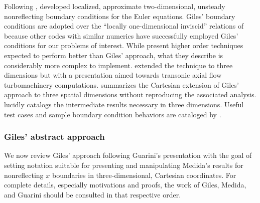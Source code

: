 \documentclass[letterpaper,11pt,nointlimits,reqno,draft]{amsbook}
\begin{document}
Following \citet{Engquist1977Absorbing},
\citet{Giles1988Nonreflecting,Giles1990Nonreflecting} developed localized,
approximate two-dimensional, unsteady nonreflecting boundary conditions for the
Euler equations.  Giles' boundary conditions are adopted over the ``locally
one-dimensional inviscid'' relations of \citet{Poinsot1992Boundary} because
other codes with similar numerics have successfully employed Giles' conditions
for our problems of interest.  While \citet{Rowley2000Discretely} present
higher order techniques expected to perform better than Giles' approach, what
they describe is considerably more complex to implement.
\citet{Saxer1993QuasiThreeDimensional} extended the technique to three
dimensions but with a presentation aimed towards transonic axial flow
turbomachinery computations.  \citet{Guarini1998} summarizes the Cartesian
extension of Giles' approach to three spatial dimensions without reproducing
the associated analysis.  \citet{Medida2007} lucidly catalogs the intermediate
results necessary in three dimensions.  Useful test cases and sample boundary
condition behaviors are cataloged by \citet{Baum1995Accurate}.

\subsubsection{Giles' abstract approach}
\label{sec:gilesabstract}

We now review Giles' approach following Guarini's presentation with the goal of
setting notation suitable for presenting and manipulating Medida's results for
nonreflecting $x$ boundaries in three-dimensional, Cartesian coordinates.  For
complete details, especially motivations and proofs, the work of Giles, Medida,
and Guarini should be consulted in that respective order.
\end{document}
